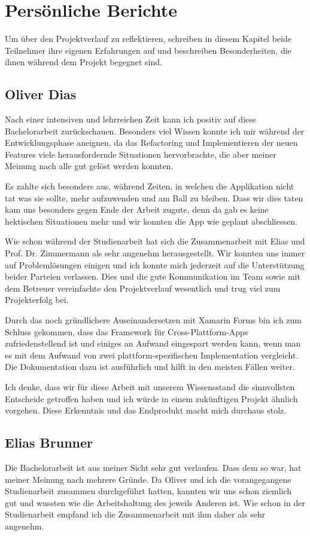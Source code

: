 \section{Persönliche Berichte}
Um über den Projektverlauf zu reflektieren, schreiben in diesem Kapitel beide Teilnehmer ihre eigenen Erfahrungen auf und beschreiben Besonderheiten, die ihnen während dem Projekt begegnet sind. 

\subsection{Oliver Dias}

Nach einer intensiven und lehrreichen Zeit kann ich positiv auf diese Bachelorarbeit zurückschauen. Besonders viel Wissen konnte ich mir während der Entwicklungsphase aneignen, da das Refactoring und Implementieren der neuen Features viele herausfordernde Situationen hervorbrachte, die aber meiner Meinung nach alle gut gelöst werden konnten.  

Es zahlte sich besonders aus, während Zeiten, in welchen die Applikation nicht tat was sie sollte, mehr aufzuwenden und am Ball zu bleiben. Dass wir dies taten kam uns besonders gegen Ende der Arbeit zugute, denn da gab es keine hektischen Situationen mehr und wir konnten die App wie geplant abschliessen.

Wie schon während der Studienarbeit hat sich die Zusammenarbeit mit Elias und Prof. Dr. Zimmermann als sehr angenehm herausgestellt. Wir konnten uns immer auf Problemlösungen einigen und ich konnte mich jederzeit auf die Unterstützung beider Parteien verlassen. Dies und die gute Kommunikation im Team sowie mit dem Betreuer vereinfachte den Projektverlauf wesentlich und trug viel zum Projekterfolg bei. 

Durch das noch gründlichere Auseinandersetzen mit Xamarin Forms bin ich zum Schluss gekommen, dass das Framework für Cross-Plattform-Apps zufriedenstellend ist und einiges an Aufwand eingespart werden kann, wenn man es mit dem Aufwand von zwei plattform-spezifischen Implementation vergleicht. Die Dokumentation dazu ist ausführlich und hilft in den meisten Fällen weiter. 

Ich denke, dass wir für diese Arbeit mit unserem Wissensstand die sinnvollsten Entscheide getroffen haben und ich würde in einem zukünftigen Projekt ähnlich vorgehen. Diese Erkenntnis und das Endprodukt macht mich durchaus stolz.

\subsection{Elias Brunner}
Die Bachelorarbeit ist aus meiner Sicht sehr gut verlaufen. Dass dem so war, hat meiner Meinung nach mehrere Gründe. Da Oliver und ich die vorangegangene Studienarbeit zusammen durchgeführt hatten, kannten wir uns schon ziemlich gut und wussten wie die Arbeitshaltung des jeweils Anderen ist. Wie schon in der Studienarbeit empfand ich die Zusammenarbeit mit ihm daher als sehr angenehm.

